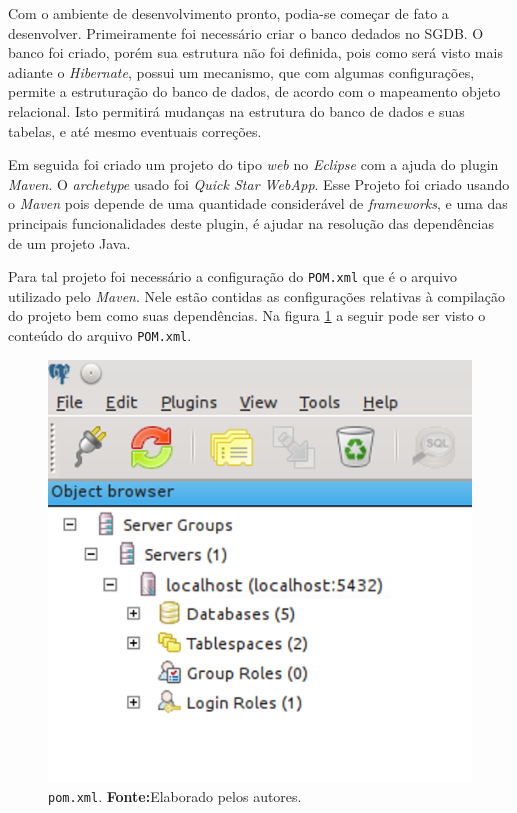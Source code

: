 
	\par Com o ambiente de desenvolvimento pronto, podia-se começar de fato a
desenvolver. Primeiramente foi necessário criar o banco dedados no SGDB. O
banco foi criado, porém sua estrutura não foi definida, pois como será
visto mais adiante o \textit{Hibernate}, possui um mecanismo, que com algumas
configurações, permite a estruturação do banco de dados, de acordo com o
mapeamento objeto relacional. Isto permitirá mudanças na estrutura do banco de
dados e suas tabelas, e até mesmo eventuais correções.

	\par Em seguida foi criado um projeto do tipo \textit{web} no \textit{Eclipse}
com a ajuda do plugin \textit{Maven}. O \textit{archetype} usado foi
\textit{Quick Star WebApp}. Esse Projeto foi criado usando o \textit{Maven}
pois depende de uma quantidade considerável de \textit{frameworks}, e uma das
principais funcionalidades deste plugin, é ajudar na resolução das dependências
de um projeto Java.

	\par Para tal projeto foi necessário a configuração do \texttt{POM.xml} que é o
arquivo utilizado pelo \textit{Maven}. Nele estão contidas as configurações
relativas à compilação do projeto bem como suas dependências.  Na figura
\ref{fig:desws} a seguir pode ser visto o conteúdo do arquivo
\texttt{POM.xml}.

\pagebreak
\begin{figure}[h!]
	\centerline{\includegraphics[scale=0.8]{./imagens/2_q_metodologico/4_procedimentos_resultados/43_webservice/432_desenvolvimento/desws.png}}
	\caption[\texttt{pom.xml}]{\texttt{pom.xml}.
		\textbf{Fonte:}Elaborado pelos autores.}
	\label{fig:desws}
\end{figure}

